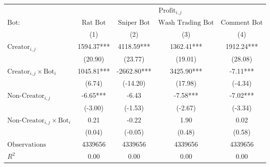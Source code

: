 \begin{tabular}{lcccc}
\toprule
 & \multicolumn{4}{c}{$\text{Profit}_{i,j}$} \\
\cline{2-5}
 $\text{Bot}:$ & $\text{Rat Bot}$ & $\text{Sniper Bot}$ & $\text{Wash Trading Bot}$ & $\text{Comment Bot}$ \\
 & (1) & (2) & (3) & (4)\\
\midrule
$\text{Creator}_{i,j}$ & 1594.37*** & 4118.59*** & 1362.41*** & 1912.24*** \\
 & (20.90) & (23.77) & (19.01) & (28.08) \\
$\text{Creator}_{i,j} \times \text{Bot}_i$ & 1045.81*** & -2662.80*** & 3425.90*** & -7.11*** \\
 & (6.74) & (-14.20) & (17.98) & (-4.34) \\
$\text{Non-Creator}_{i,j}$ & -6.65*** & -6.43 & -7.58*** & -7.02*** \\
 & (-3.00) & (-1.53) & (-2.67) & (-3.34) \\
$\text{Non-Creator}_{i,j} \times \text{Bot}_i$ & 0.21 & -0.22 & 1.90 & 0.02 \\
 & (0.04) & (-0.05) & (0.48) & (0.58) \\
\midrule
$\text{Observations}$ & 4339656 & 4339656 & 4339656 & 4339656 \\
$R^2$ & 0.00 & 0.00 & 0.00 & 0.00 \\
\bottomrule
\end{tabular}